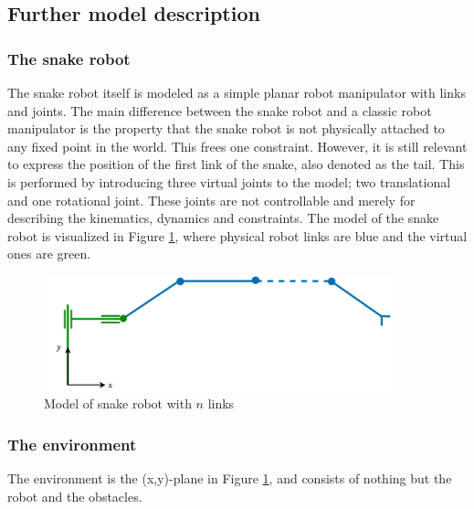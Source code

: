 
\subsection{Further model description}

\subsubsection{The snake robot}
The snake robot itself is modeled as a simple planar robot manipulator with links and joints. The main difference between the snake robot and a classic robot manipulator is the property that the snake robot is not physically attached to any fixed point in the world. This frees one constraint. However, it is still relevant to express the position of the first link of the snake, also denoted as the tail. This is performed by introducing three virtual joints to the model; two translational and one rotational joint. These joints are not controllable and merely for describing the kinematics, dynamics and constraints. The model of the snake robot is visualized in Figure \ref{fig:2_kin}, where physical robot links are blue and the virtual ones are green.

\begin{figure}[h!]
    \centering
    \includegraphics[width=0.9\textwidth]{figures/modelspecs/superbasicsnake.pdf}
    \caption{Model of snake robot with $n$ links}
    \label{fig:2_kin}
\end{figure}


\subsubsection{The environment}
The environment is the (x,y)-plane in Figure \ref{fig:2_kin}, and consists of nothing but the robot and the obstacles.

